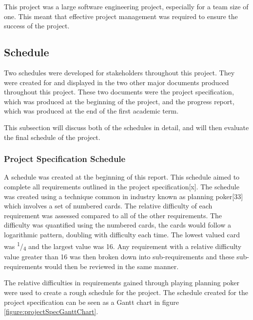 \documentclass{article}
\begin{document}
This project was a large software engineering project, especially for a team size of one. This meant that effective project management was required to ensure the success of the project. \par

\subsection{Schedule}

Two schedules were developed for stakeholders throughout this project. They were created for and displayed in the two other major documents produced throughout this project. These two documents were the project specification, which was produced at the beginning of the project, and the progress report, which was produced at the end of the first academic term. \par

This subsection will discuss both of the schedules in detail, and will then evaluate the final schedule of the project. \par

\subsubsection{Project Specification Schedule}

A schedule was created at the beginning of this report. This schedule aimed to complete all requirements outlined in the project specification[x]. The schedule was created using a technique common in industry known as planning poker[33] which involves a set of numbered cards. The relative difficulty of each requirement was assessed compared to all of the other requirements. The difficulty was quantified using the numbered cards, the cards would follow a logarithmic pattern, doubling with difficulty each time. The lowest valued card was \textsuperscript{1}/\textsubscript{4} and the largest value was 16. Any requirement with a relative difficulty value greater than 16 was then broken down into sub-requirements and these sub-requirements would then be reviewed in the same manner. \par

The relative difficulties in requirements gained through playing planning poker were used to create a rough schedule for the project. The schedule created for the project specification can be seen as a Gantt chart in figure \ref{figure:projectSpecGanttChart}. \par
\end{document}
